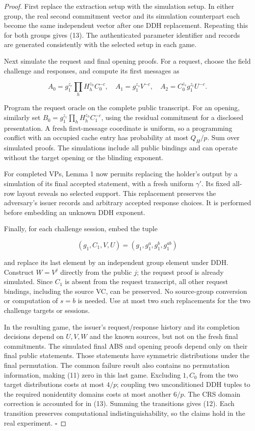 \documentclass[11pt]{article}
\begin{document}
\begin{proof}
First replace the extraction setup with the simulation setup. In either group, the real second commitment vector and its simulation counterpart each become the same independent vector after one DDH replacement. Repeating this for both groups gives (13). The authenticated parameter identifier and records are generated consistently with the selected setup in each game.

Next simulate the request and final opening proofs. For a request, choose the field challenge and responses, and compute its first messages as

\[
A_0=g_1^{z_r}\prod_hH_h^{z_h}C_0^{-c},\quad
A_1=g_1^{z_s}V^{-c},\quad
A_2=C_0^{z_s}g_1^{z_t}U^{-c}.
\tag{14}
\]

Program the request oracle on the complete public transcript. For an opening, similarly set \(B_0=g_1^{z_r}\prod_hH_h^{z_h}C_1^{-c}\), using the residual commitment for a disclosed presentation. A fresh first-message coordinate is uniform, so a programming conflict with an occupied cache entry has probability at most \(Q_H/p\). Sum over simulated proofs. The simulations include all public bindings and can operate without the target opening or the blinding exponent.

For completed VPs, Lemma 1 now permits replacing the holder's output by a simulation of its final accepted statement, with a fresh uniform \(\gamma'\). Its fixed all-row layout reveals no selected support. This replacement preserves the adversary's issuer records and arbitrary accepted response choices. It is performed before embedding an unknown DDH exponent.

Finally, for each challenge session, embed the tuple

\[
(g_1,C_1,V,U)=(g_1,g_1^a,g_1^b,g_1^{ab})
\tag{15}
\]

and replace its last element by an independent group element under DDH. Construct \(W=V^j\) directly from the public \(j\); the request proof is already simulated. Since \(C_1\) is absent from the request transcript, all other request bindings, including the source VC, can be preserved. No source-group conversion or computation of \(s=b\) is needed. Use at most two such replacements for the two challenge targets or sessions.

In the resulting game, the issuer's request/response history and its completion decisions depend on \(U,V,W\) and the known sources, but not on the fresh final commitments. The simulated final ABS and opening proofs depend only on their final public statements. Those statements have symmetric distributions under the final permutation. The common failure result also contains no permutation information, making (11) zero in this last game. Excluding \(1,C_0\) from the two target distributions costs at most \(4/p\); coupling two unconditioned DDH tuples to the required nonidentity domains costs at most another \(6/p\). The CRS domain correction is accounted for in (13). Summing the transitions gives (12). Each transition preserves computational indistinguishability, so the claims hold in the real experiment. \(\square\)

\end{proof}
\end{document}
